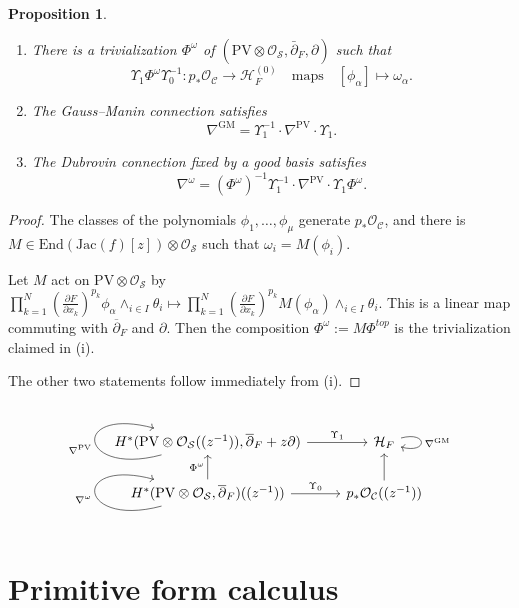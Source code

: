 \documentclass[12pt,a4paper]{amsart}
\newcommand{\Jac}{\mathrm{Jac}}
\def\C{{\mathcal C}}
\def\H{{\mathcal H}}
\def\O{{\mathcal O}}
\renewcommand{\S}{{\mathcal S}}
\newcommand{\p}{{\partial}}
\newcommand{\<}{\left<}
\renewcommand{\>}{\right>}
\newcommand{\PV}{{\mathrm{PV}}}
\newcommand{\GM}{{\mathrm{GM}}}
\newcommand{\End}{{\mathrm{End}}}
\newtheorem{proposition}[theorem]{Proposition}
\numberwithin{equation}{section}
\begin{document}
\begin{proposition}\label{prop: connections match}~
\begin{enumerate}
    \item[(i)] There is a trivialization $\Phi^\omega$ of $(\PV \otimes \O_\S, \bar \p_F, \p)$ such that
        \[
            \Upsilon_1\Phi^\omega\Upsilon_0^{-1}: p_\ast\O_\C \to \H_F^{(0)} \quad \text{maps} \quad [\phi_\alpha] \mapsto \omega_\alpha.
        \]
    \item[(ii)] The Gauss--Manin connection satisfies
    \[
        \nabla^\GM = \Upsilon_1^{-1} \cdot \nabla^\PV \cdot \Upsilon_1.
    \]
    \item[(iii)] The Dubrovin connection fixed by a good basis satisfies
    \[
        \nabla^\omega = (\Phi^\omega)^{-1}\Upsilon_1^{-1} \cdot \nabla^\PV \cdot \Upsilon_1 \Phi^\omega.
    \]
\end{enumerate}

\end{proposition}
\begin{proof}
    The classes of the polynomials $\phi_1,\dots,\phi_\mu$ generate $p_\ast \O_\C$, and there is $M \in \End(\Jac(f)[z])\otimes \O_\S$ such that $\omega_i = M(\phi_i)$.

    Let $M$ act on $\PV\otimes \O_\S$ by $\prod_{k=1}^N \left(\frac{\p F}{\p x_k} \right)^{p_k} \phi_\alpha \wedge_{i\in I} \theta_i  \mapsto \prod_{k=1}^N \left(\frac{\p F}{\p x_k} \right)^{p_k} M(\phi_\alpha) \wedge_{i\in I} \theta_i$. This is a linear map commuting with $\overline{\p}_F$ and $\p$.
    Then the composition $\Phi^\omega := M \Phi^{top}$ is the trivialization claimed in (i).

    The other two statements follow immediately from (i).
\end{proof}

\[
    \begin{tikzcd}
    H^\ast(\PV\otimes \O_\S((z^{-1})),\overline{\p}_F + z \p ) \arrow[loop left, "\nabla^\PV"] \arrow{r}{\Upsilon_1} &  \H_F \arrow[loop right, "\nabla^\GM"]
    \\
    H^\ast(\PV\otimes \O_\S,\overline{\p}_F)((z^{-1})) \arrow[loop left, "\nabla^\omega"] \arrow{r}{\Upsilon_0} \arrow{u}{\Phi^\omega} &  p_\ast \O_\C \arrow{u}((z^{-1}))
    \end{tikzcd}
\]

\section{Primitive form calculus}
\end{document}
